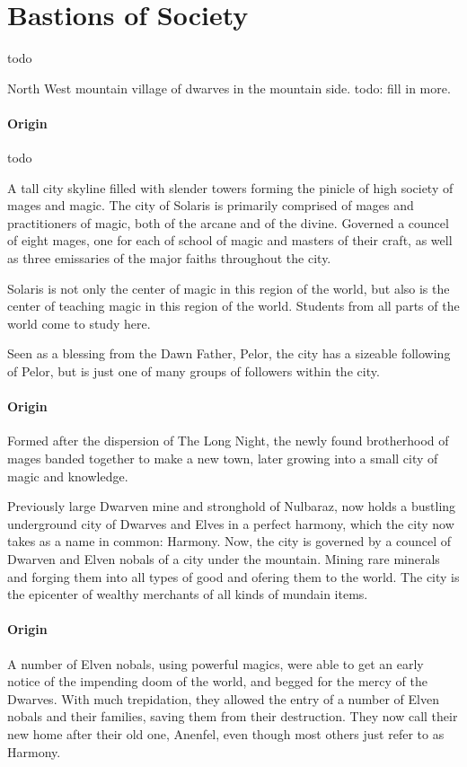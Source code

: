 \documentclass[letterpaper,twocolumn,openany,nodeprecatedcode]{dndbook}
\begin{document}
\section{Bastions of Society}

todo


North West mountain village of dwarves in the mountain side. todo: fill in more.

\paragraph{Origin}
todo


A tall city skyline filled with slender towers forming the pinicle of high society of
mages and magic. The city of Solaris is primarily comprised of mages and practitioners
of magic, both of the arcane and of the divine. Governed a councel of eight mages, one
for each of school of magic and masters of their craft, as well as three emissaries of
the major faiths throughout the city.

Solaris is not only the center of magic in this region of the world, but also is the
center of teaching magic in this region of the world. Students from all parts of the
world come to study here.

Seen as a blessing from the Dawn Father, Pelor, the city has a sizeable following of
Pelor, but is just one of many groups of followers within the city.

\paragraph{Origin}
Formed after the dispersion of The Long Night, the newly found brotherhood of mages banded
together to make a new town, later growing into a small city of magic and knowledge.


Previously large Dwarven mine and stronghold of Nulbaraz, now holds a bustling underground
city of Dwarves and Elves in a perfect harmony, which the city now takes as a name in common:
Harmony. Now, the city is governed by a councel of Dwarven and Elven nobals of a city under
the mountain. Mining rare minerals and forging them into all types of good and ofering them
to the world. The city is the epicenter of wealthy merchants of all kinds of mundain items.

\paragraph{Origin}
A number of Elven nobals, using powerful magics, were able to get an early notice of the
impending doom of the world, and begged for the mercy of the Dwarves. With much trepidation,
they allowed the entry of a number of Elven nobals and their families, saving them from their
destruction. They now call their new home after their old one, Anenfel, even though most
others just refer to as Harmony.
\end{document}
